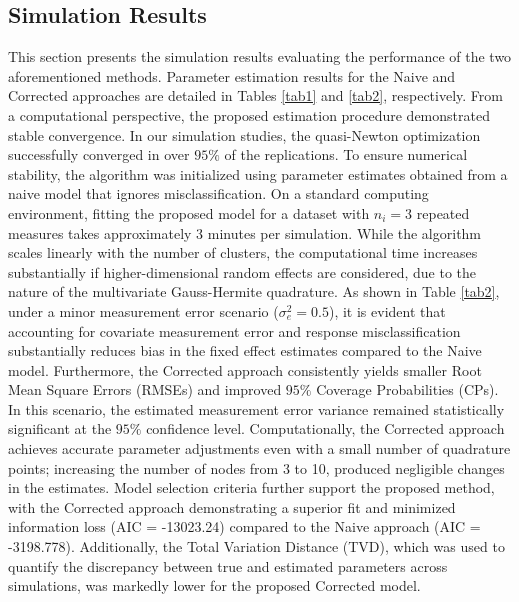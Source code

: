 \documentclass[twoside]{article}
\begin{document}
		\subsection{Simulation Results}
This section presents the simulation results evaluating the performance of the two aforementioned methods. Parameter estimation results for the Naive and Corrected approaches are detailed in Tables \ref{tab1} and \ref{tab2}, respectively. From a computational perspective, the proposed estimation procedure demonstrated stable convergence. In our simulation studies, the quasi-Newton optimization successfully converged in over $95 \%$ of the replications. To ensure numerical stability, the algorithm was initialized using parameter estimates obtained from a naive model that ignores misclassification. On a standard computing environment, fitting the proposed model for a dataset with $n_i=3$ repeated measures takes approximately 3 minutes per simulation. While the algorithm scales linearly with the number of clusters, the computational time increases substantially if higher-dimensional random effects are considered, due to the nature of the multivariate Gauss-Hermite quadrature.
As shown in Table \ref{tab2}, under a minor measurement error scenario ($\sigma_e^2=0.5$), it is evident that accounting for covariate measurement error and response misclassification substantially reduces bias in the fixed effect estimates compared to the Naive model. Furthermore, the Corrected approach consistently yields smaller Root Mean Square Errors (RMSEs) and improved $95 \%$ Coverage Probabilities (CPs). In this scenario, the estimated measurement error variance remained statistically significant at the $95 \%$ confidence level.
Computationally, the Corrected approach achieves accurate parameter adjustments even with a small number of quadrature points; increasing the number of nodes from 3 to 10, produced negligible changes in the estimates. Model selection criteria further support the proposed method, with the Corrected approach demonstrating a superior fit and minimized information loss (AIC = -13023.24) compared to the Naive approach (AIC = -3198.778). Additionally, the Total Variation Distance (TVD), which was used to quantify the discrepancy between true and estimated parameters across simulations, was markedly lower for the proposed Corrected model.
\end{document}
